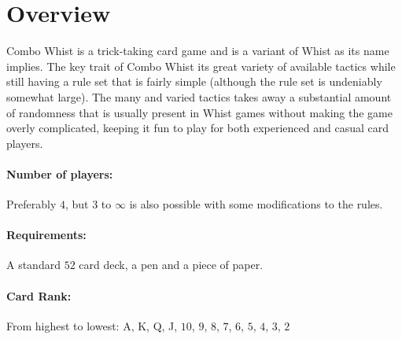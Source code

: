 \documentclass[a4paper]{article}
\begin{document}
	\section{Overview}{%
		Combo Whist is a trick-taking card game and is a variant of Whist as its name implies. The key trait of Combo Whist its great variety of available tactics while still having a rule set that is fairly simple (although the rule set is undeniably somewhat large). The many and varied tactics takes away a substantial amount of randomness that is usually present in Whist games without making the game overly complicated, keeping it fun to play for both experienced and casual card players.

		\paragraph{Number of players:}
		Preferably $4$, but $3$ to $\infty$ is also possible with some modifications to the rules.

		\paragraph{Requirements:}
		A standard $52$ card deck, a pen and a piece of paper.

		\paragraph{Card Rank:}
		From highest to lowest: A, K, Q, J, $10$, $9$, $8$, $7$, $6$, $5$, $4$, $3$, $2$
	}
\end{document}
